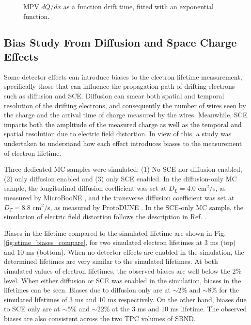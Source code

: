 \begin{figure}[bp!]
\begin{subfigure}[b]{0.495\textwidth}
        \end{subfigure}
        \caption[Most Probable Value dQ/dx Against Drift Time]{MPV $dQ/dx$ as a function drift time, fitted with an exponential function.}
        \label{fig:etime_tpc}
\end{figure}

\subsection{Bias Study From Diffusion and Space Charge Effects}
\label{sec7:etime_bias}

Some detector effects can introduce biases to the electron lifetime measurement, specifically those that can influence the propagation path of drifting electrons such as diffusion and SCE.
Diffusion can smear both spatial and temporal resolution of the drifting electrons, and consequently the number of wires seen by the charge and the arrival time of charge measured by the wires.
Meanwhile, SCE impacts both the amplitude of the measured charge as well as the temporal and spatial resolution due to electric field distortion.
In view of this, a study was undertaken to understand how each effect introduces biases to the measurement of electron lifetime.

Three dedicated MC samples were simulated: (1) No SCE nor diffusion enabled, (2) only diffusion enabled and (3) only SCE enabled.
In the diffusion-only MC sample, the longitudinal diffusion coefficient was set at $D_{L} = 4.0 $ cm$^{2}$/s, as measured by MicroBooNE \cite{uboone_diff}, and the transverse diffusion coefficient was set at $D_T = 8.8 $ cm$^{2}$/s, as measured by ProtoDUNE \cite{protodune}.     
In the SCE-only MC sample, the simulation of electric field distortion follows the description in Ref. \cite{SCE}.

Biases in the lifetime compared to the simulated lifetime are shown in Fig. \ref{fig:etime_biases_compare}, for two simulated electron lifetimes at 3 ms (top) and 10 ms (bottom).
When no detector effects are enabled in the simulation, the determined lifetimes are very similar to the simulated lifetimes.
At both simulated values of electron lifetimes, the observed biases are well below the 2\% level.
When either diffusion or SCE was enabled in the simulation, biases in the lifetimes can be seen.
Biases due to diffusion only are at $\sim 2\%$ and $\sim 8 \%$ for the simulated lifetimes of 3 ms and 10 ms respectively.
On the other hand, biases due to SCE only are at $\sim 5 \%$ and $\sim22 \%$ at the 3 ms and 10 ms lifetime.
The observed biases are also consistent across the two TPC volumes of SBND.

